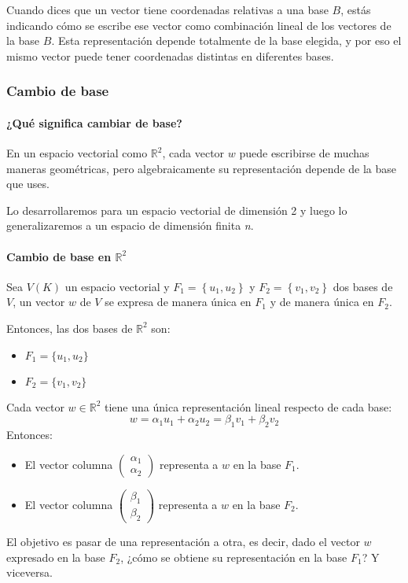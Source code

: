 \begin{tcolorbox}
  Cuando dices que un vector tiene coordenadas relativas a una base \(B\), estás indicando cómo se escribe ese vector como combinación lineal de los vectores de la base \(B\). Esta representación depende totalmente de la base elegida, y por eso el mismo vector puede tener coordenadas distintas en diferentes bases.
\end{tcolorbox}

\subsubsection{Cambio de base}

\paragraph{¿Qué significa cambiar de base?}

En un espacio vectorial como \(\mathbb{R}^2\), cada vector \(w\) puede escribirse de muchas maneras geométricas, pero algebraicamente su representación depende de la base que uses.

Lo desarrollaremos para un espacio vectorial de dimensión 2 y luego lo generalizaremos a un espacio de dimensión finita \textit{n}.

\paragraph{Cambio de base en \(\mathbb{R}^2\)}

Sea \(V(K)\) un espacio vectorial y \(F_1 = \left\{u_1, u_2\right\}\) y \(F_2 = \left\{v_1, v_2\right\}\) dos bases de \(V\), un vector \(w\) de \(V\) se expresa de manera única en \(F_1\) y de manera única en \(F_2\).

Entonces, las dos bases de \(\mathbb{R}^2\) son:
\begin{itemize}
  \item \(F_1 = \{u_1, u_2\}\)
  \item \(F_2 = \{v_1, v_2\}\)
\end{itemize}
Cada vector \(w\in \mathbb{R}^2\) tiene una única representación lineal respecto de cada base:
\[
w = \alpha_1 u_1 + \alpha_2 u_2 = \beta_1 v_1 + \beta_2 v_2
\]
Entonces:
\begin{itemize}
  \item El vector columna \(\begin{pmatrix} \alpha_1 \\ \alpha_2 \end{pmatrix}\) representa a \(w\) en la base \(F_1\).
  \item El vector columna \(\begin{pmatrix} \beta_1 \\ \beta_2 \end{pmatrix}\) representa a \(w\) en la base \(F_2\).
\end{itemize}
El objetivo es pasar de una representación a otra, es decir, dado el vector \(w\) expresado en la base \(F_2\), ¿cómo se obtiene su representación en la base \(F_1\)? Y viceversa.


